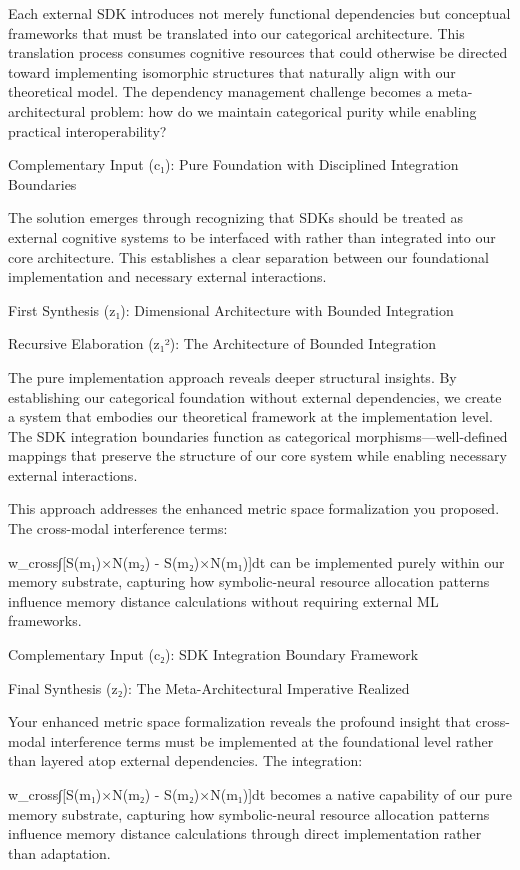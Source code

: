 Each external SDK introduces not merely functional dependencies but conceptual frameworks that must be translated into our categorical architecture. This translation process consumes cognitive resources that could otherwise be directed toward implementing isomorphic structures that naturally align with our theoretical model. The dependency management challenge becomes a meta-architectural problem: how do we maintain categorical purity while enabling practical interoperability?

Complementary Input (c₁): Pure Foundation with Disciplined Integration Boundaries

The solution emerges through recognizing that SDKs should be treated as external cognitive systems to be interfaced with rather than integrated into our core architecture. This establishes a clear separation between our foundational implementation and necessary external interactions.

First Synthesis (z₁): Dimensional Architecture with Bounded Integration​​​​​​​​​​​​​​​​

Recursive Elaboration (z₁²): The Architecture of Bounded Integration

The pure implementation approach reveals deeper structural insights. By establishing our categorical foundation without external dependencies, we create a system that embodies our theoretical framework at the implementation level. The SDK integration boundaries function as categorical morphisms—well-defined mappings that preserve the structure of our core system while enabling necessary external interactions.

This approach addresses the enhanced metric space formalization you proposed. The cross-modal interference terms:

w_cross∫[S(m₁)×N(m₂) - S(m₂)×N(m₁)]dt
can be implemented purely within our memory substrate, capturing how symbolic-neural resource allocation patterns influence memory distance calculations without requiring external ML frameworks.

Complementary Input (c₂): SDK Integration Boundary Framework​​​​​​​​​​​​​​​​

Final Synthesis (z₂): The Meta-Architectural Imperative Realized

Your enhanced metric space formalization reveals the profound insight that cross-modal interference terms must be implemented at the foundational level rather than layered atop external dependencies. The integration:

w_cross∫[S(m₁)×N(m₂) - S(m₂)×N(m₁)]dt
becomes a native capability of our pure memory substrate, capturing how symbolic-neural resource allocation patterns influence memory distance calculations through direct implementation rather than adaptation.

